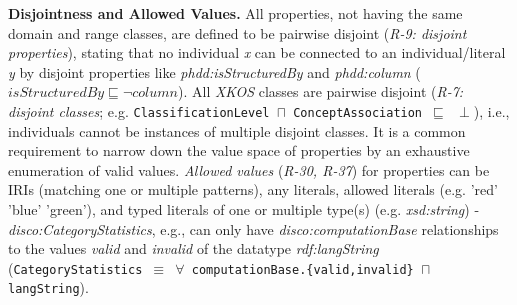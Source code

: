 \documentclass{llncs}
\newcommand{\ms}[1]{\texttt{#1}}
\begin{document}
{{\textbf{Disjointness and Allowed Values.}
All properties, not having the same domain and range classes, are defined to be pairwise disjoint
(\emph{R-9: disjoint properties}), stating that no individual \emph{x} can be connected to an individual/literal \emph{y} by disjoint properties like \emph{phdd:isStructuredBy} and \emph{phdd:column} ($isStructuredBy \sqsubseteq \neg column$).
All \emph{XKOS} classes are pairwise disjoint (\emph{R-7: disjoint classes}; e.g. \ms{ClassificationLevel $\sqcap$ ConceptAssociation $\sqsubseteq$ $\perp$}),
i.e., individuals cannot be instances of multiple disjoint classes.
It is a common requirement to narrow down the value space of properties by an exhaustive enumeration of valid values.  
\emph{Allowed values} (\emph{R-30, R-37}) for properties can be IRIs (matching one or multiple patterns), any literals, allowed literals (e.g. 'red' 'blue' 'green'), and typed literals of one or multiple type(s) (e.g. \emph{xsd:string}) - 
\emph{disco:CategoryStatistics}, e.g., can only have \emph{disco:computationBase} relationships to the values \emph{valid} and \emph{invalid} of the datatype \emph{rdf:langString} (\ms{CategoryStatistics $\equiv$ $\forall$ computationBase.\{valid,invalid\} $\sqcap$ langString}).

}}
\end{document}
